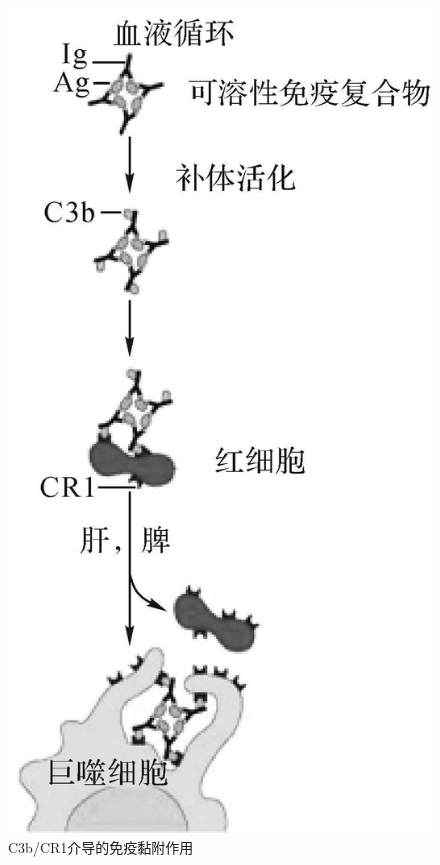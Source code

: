 \begin{figure}[!htbp]
 \centering
 \includegraphics{./images/Image00089.jpg}
 \captionsetup{justification=centering}
 \caption{C3b/CR1介导的免疫黏附作用}
 \label{fig5-11}
  \end{figure} 



